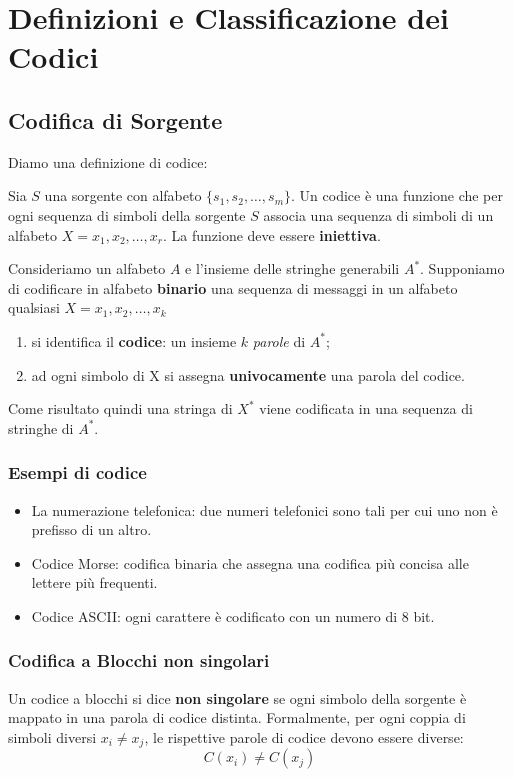 \section{Definizioni e Classificazione dei Codici}

\subsection{Codifica di Sorgente}
Diamo una definizione di codice:
\begin{definition}
Sia $S$  una sorgente con alfabeto $\{s_1, s_2, \dots, s_m\}$.\newline
Un codice è una funzione che per ogni sequenza di simboli della sorgente $S$ associa una sequenza di simboli di un alfabeto $X = {x_1, x_2, \dots, x_r}$. La funzione deve essere \textbf{iniettiva}.
\end{definition}

Consideriamo un alfabeto $A$ e l'insieme delle stringhe generabili $A^*$.
Supponiamo di codificare in alfabeto \textbf{binario} una sequenza di messaggi in un alfabeto qualsiasi $X = {x_1, x_2, \dots, x_k}$
\begin{enumerate}
  \item si identifica il \textbf{codice}: un insieme $k$ \textit{parole} di $A^*$;
  \item ad ogni simbolo di X si assegna \textbf{univocamente} una parola del codice. 
\end{enumerate}
Come risultato quindi una stringa di $X^*$ viene codificata in una sequenza di stringhe di $A^*$.



\subsubsection{Esempi di codice}
\begin{itemize}
\item La numerazione telefonica: due numeri telefonici sono tali per cui uno non è prefisso di un altro.
\item Codice Morse: codifica binaria che assegna una codifica più concisa alle lettere più frequenti.
\item Codice ASCII: ogni carattere è codificato con un numero di 8 bit.
\end{itemize}

\subsubsection{Codifica a Blocchi \textbf{non} singolari}
Un codice a blocchi si dice \textbf{non singolare} se ogni simbolo della sorgente è mappato in una parola di codice distinta. Formalmente, per ogni coppia di simboli diversi $x_i \neq x_j$, le rispettive parole di codice devono essere diverse:
\[ C(x_i) \neq C(x_j) \]

